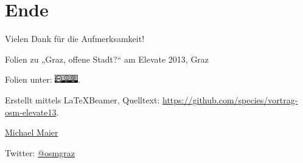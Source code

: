 \documentclass{beamer}
\begin{document}
\section{Ende}

\begin{frame}{Vielen Dank für die Aufmerksamkeit!}

  Folien zu „Graz, offene Stadt?“ am Elevate 2013, Graz
\vspace{1cm}

Folien unter: \includegraphics[width=1cm]{cc-by-sa.png}.
\vspace{1cm}

Erstellt mittels \LaTeX Beamer, Quelltext: \url{https://github.com/species/vortrag-osm-elevate13}.
\vspace{1cm}

\href{mailto:michael.maier@student.tugraz.at}{Michael Maier}

Twitter: \href{https://twitter.com/osmgraz}{@osmgraz}
\end{frame}
\end{document}
